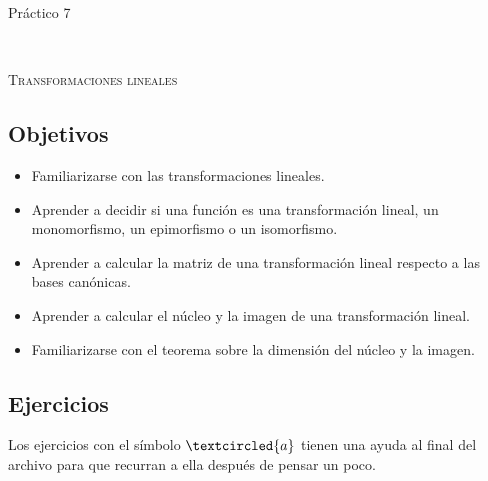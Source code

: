\documentclass[12pt]{amsart}
\begin{document}



\centerline{\Large{Pr\' actico 7}}

\

\centerline{\textsc{Transformaciones lineales}}

\subsection*{Objetivos}

\begin{itemize}
 \item Familiarizarse con las transformaciones lineales.
 \item Aprender a decidir si una funci\'on es una transformaci\'on lineal, un monomorfismo, un epimorfismo o un isomorfismo.
 \item Aprender a calcular la matriz de una transformaci\'on lineal respecto a las bases can\'onicas.
 \item Aprender a calcular el n\'ucleo y la imagen de una transformaci\'on lineal.
 \item Familiarizarse con el teorema sobre la dimensi\'on del n\'ucleo y la imagen.
\end{itemize}


\medbreak


\subsection*{Ejercicios} Los ejercicios con el s\'imbolo $\textcircled{a}$ tienen una ayuda al final del archivo para que recurran a ella despu\'es de pensar un poco.
\end{document}

